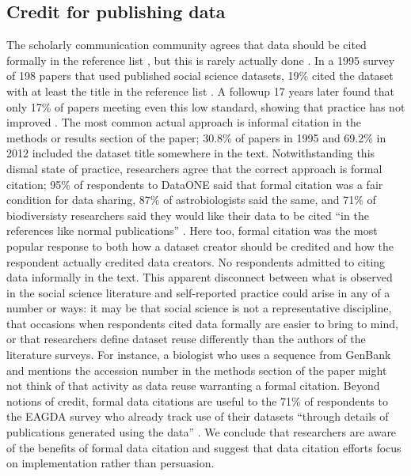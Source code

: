 \documentclass[10pt]{article}
\begin{document}
\subsection*{Credit for publishing data}

The scholarly communication community agrees that data should be cited formally in the reference list \cite{force11_data_citation_synthesis_group_joint_2014}, but this is rarely actually done \cite{sieber_not_1995, mooney_citing_2011, mooney_anatomy_2012}.
In a 1995 survey of 198 papers that used published social science datasets, 19\% cited the dataset with at least the title in the reference list \cite{sieber_not_1995}.
A followup 17 years later found that only 17\% of papers meeting even this low standard, showing that practice has not improved \cite{mooney_anatomy_2012}.
The most common actual approach is informal citation in the methods or results section of the paper; 30.8\% of papers in 1995 and 69.2\% in 2012 included the dataset title somewhere in the text.
Notwithstanding this dismal state of practice, researchers agree that the correct approach is formal citation; 95\% of respondents to DataONE said that formal citation was a fair condition for data sharing, 87\% of astrobiologists said the same, and 71\% of biodiversisty researchers said they would like their data to be cited ``in the references like normal publications'' \cite{tenopir_data_2011, aydinoglu_data_2014, enke_users_2012}.
Here too, formal citation was the most popular response to both how a dataset creator should be credited and how the respondent actually credited data creators.
No respondents admitted to citing data informally in the text.
This apparent disconnect between what is observed in the social science literature and self-reported practice could arise in any of a number or ways: it may be that social science is not a representative discipline, that occasions when respondents cited data formally are easier to bring to mind, or that researchers define dataset reuse differently than the authors of the literature surveys.
For instance, a biologist who uses a sequence from GenBank and mentions the accession number in the methods section of the paper might not think of that activity as data reuse warranting a formal citation.
Beyond notions of credit, formal data citations are useful to the 71\% of respondents to the EAGDA survey who already track use of their datasets ``through details of publications generated using the data'' \cite{bobrow_establishing_2014}. 
We conclude that researchers are aware of the benefits of formal data citation and suggest that data citation efforts focus on implementation rather than persuasion. 
\end{document}
